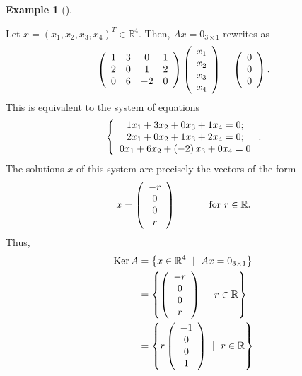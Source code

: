 \documentclass[numbers=enddot,12pt,final,onecolumn,notitlepage]{scrartcl}%
\theoremstyle{definition}
\newtheorem{exam}[theo]{Example}
\newenvironment{example}[1][]
{\begin{exam}[#1]\begin{leftbar}}
{\end{leftbar}\end{exam}}
\begin{document}
\begin{example}
Let $x=\left(  x_{1},x_{2},x_{3},x_{4}\right)  ^{T}\in\mathbb{R}^{4}$. Then,
$Ax=0_{3\times1}$ rewrites as%
\[
\left(
\begin{array}
[c]{cccc}%
1 & 3 & 0 & 1\\
2 & 0 & 1 & 2\\
0 & 6 & -2 & 0
\end{array}
\right)  \left(
\begin{array}
[c]{c}%
x_{1}\\
x_{2}\\
x_{3}\\
x_{4}%
\end{array}
\right)  =\left(
\begin{array}
[c]{c}%
0\\
0\\
0
\end{array}
\right)  .
\]
This is equivalent to the system of equations%
\[
\left\{
\begin{array}
[c]{c}%
1x_{1}+3x_{2}+0x_{3}+1x_{4}=0;\\
2x_{1}+0x_{2}+1x_{3}+2x_{4}=0;\\
0x_{1}+6x_{2}+\left(  -2\right)  x_{3}+0x_{4}=0
\end{array}
\right.  .
\]
The solutions $x$ of this system are precisely the vectors of the form%
\[
x=\left(
\begin{array}
[c]{c}%
-r\\
0\\
0\\
r
\end{array}
\right)  \ \ \ \ \ \ \ \ \ \ \text{for }r\in\mathbb{R}.
\]
Thus,%
\begin{align}
\operatorname*{Ker}A  &  =\left\{  x\in\mathbb{R}^{4}\ \mid\ Ax=0_{3\times
1}\right\} \nonumber\\
&  =\left\{  \left(
\begin{array}
[c]{c}%
-r\\
0\\
0\\
r
\end{array}
\right)  \ \mid\ r\in\mathbb{R}\right\} \label{eq.exam.kernel.1.6a}\\
&  =\left\{  r\left(
\begin{array}
[c]{c}%
-1\\
0\\
0\\
1
\end{array}
\right)  \ \mid\ r\in\mathbb{R}\right\} \label{eq.exam.kernel.1.6b}\\

\end{align}
\end{example}
\end{document}
